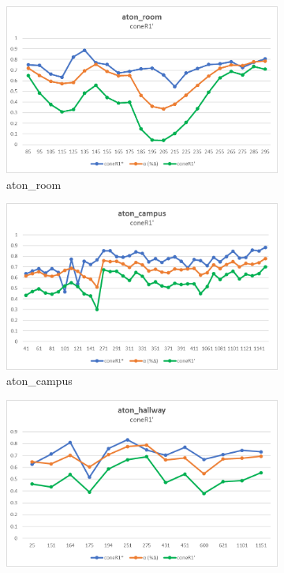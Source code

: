 \begin{appendices}
\begin{figure}
  \begin{subfigure}{.45\linewidth}
  \includegraphics[width=1\linewidth]{figures/appendix/room_prime.jpg}
  \caption{aton\_room}
\end{subfigure}
\hfill
\begin{subfigure}{.45\linewidth}
  \includegraphics[width=1\linewidth]{figures/appendix/campus_prime.jpg}
  \caption{aton\_campus}
\end{subfigure}
\hfill
\begin{subfigure}{.45\linewidth}
  \includegraphics[width=1\linewidth]{figures/appendix/hallway_prime.jpg}

\end{subfigure}
\end{figure}
\end{appendices}
